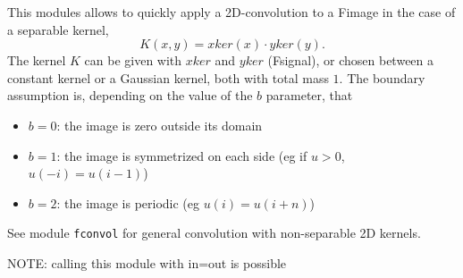 This modules allows to quickly apply a 2D-convolution to a Fimage in the 
case of a separable kernel,
$$K(x,y)=xker(x)\cdot yker(y).$$
The kernel $K$ can be given with $xker$ and $yker$ (Fsignal), or 
chosen between a constant kernel or a Gaussian kernel, both
with total mass $1$. The boundary assumption is, depending on
the value of the $b$ parameter, that
\begin{itemize}
\item $b=0$: the image is zero outside its domain
\item $b=1$: the image is symmetrized on each side 
(eg if $u>0$, $u(-i)=u(i-1)$) 
\item $b=2$: the image is periodic (eg $u(i) = u(i+n)$)
\end{itemize}
See module \verb+fconvol+ for general
convolution with non-separable 2D kernels.

\medskip

NOTE: calling this module with in=out is possible
